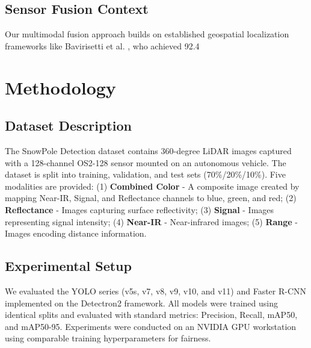 \documentclass[11pt]{article}
\begin{document}
\subsection{Sensor Fusion Context}
Our multimodal fusion approach builds on established geospatial localization frameworks like Bavirisetti et al. \cite{10706275}, who achieved 92.4%

\section{Methodology}
\subsection{Dataset Description}
The SnowPole Detection dataset contains 360-degree LiDAR images captured with a 128-channel OS2-128 sensor mounted on an autonomous vehicle. The dataset is split into training, validation, and test sets (70\%/20\%/10\%). Five modalities are provided: (1) \textbf{Combined Color} - A composite image created by mapping Near-IR, Signal, and Reflectance channels to blue, green, and red; (2) \textbf{Reflectance} - Images capturing surface reflectivity; (3) \textbf{Signal} - Images representing signal intensity; (4) \textbf{Near-IR} - Near-infrared images; (5) \textbf{Range} - Images encoding distance information.

\subsection{Experimental Setup}
We evaluated the YOLO series (v5s, v7, v8, v9, v10, and v11) and Faster R-CNN implemented on the Detectron2 framework. All models were trained using identical splits and evaluated with standard metrics: Precision, Recall, mAP50, and mAP50-95. Experiments were conducted on an NVIDIA GPU workstation using comparable training hyperparameters for fairness.
\end{document}
